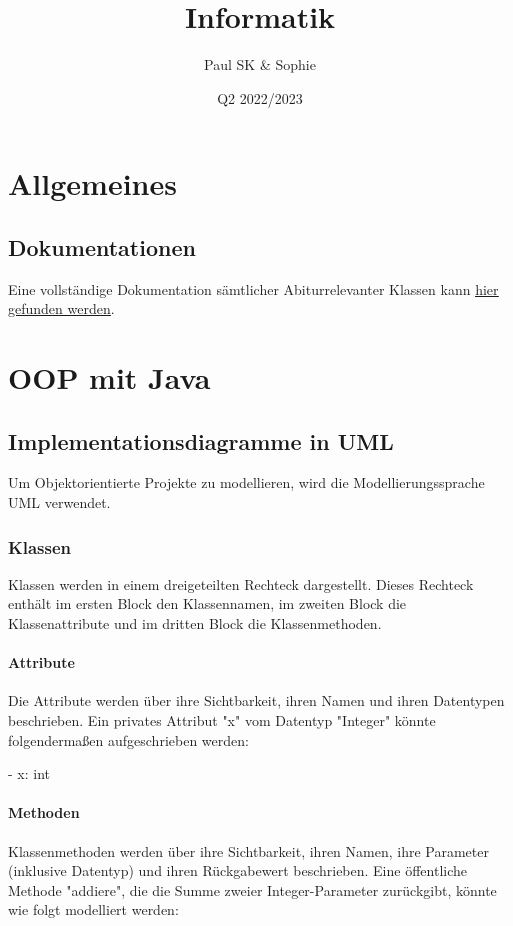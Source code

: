 \documentclass{article}
\title{Informatik}
\date{Q2 2022/2023}
\author{Paul SK \& Sophie}
\begin{document}
	\maketitle
	\newpage


	\section{Allgemeines}
	\subsection{Dokumentationen}
	Eine vollständige Dokumentation sämtlicher Abiturrelevanter Klassen kann \href{https://www.schulentwicklung.nrw.de/lehrplaene/upload/klp\_SII/if/Dokumentation\_ZA-IF\_GK-LK\_ab\_2018\_2021\_12\_22.pdf}{\underline{hier gefunden werden}}.

	\section{OOP mit Java}
	\subsection{Implementationsdiagramme in UML}
	Um Objektorientierte Projekte zu modellieren, wird die Modellierungssprache UML verwendet.

	\subsubsection{Klassen}
	Klassen werden in einem dreigeteilten Rechteck dargestellt. Dieses Rechteck enthält im ersten Block den Klassennamen, im zweiten Block die Klassenattribute und im dritten Block die Klassenmethoden.

	\paragraph{Attribute}
	Die Attribute werden über ihre Sichtbarkeit, ihren Namen und ihren Datentypen beschrieben. Ein privates Attribut "x" vom Datentyp "Integer" könnte folgendermaßen aufgeschrieben werden:

	\begin{center}
		- x: int
	\end{center}

	\paragraph{Methoden}
	Klassenmethoden werden über ihre Sichtbarkeit, ihren Namen, ihre Parameter (inklusive Datentyp) und ihren Rückgabewert beschrieben. Eine öffentliche Methode "addiere", die die Summe zweier Integer-Parameter zurückgibt, könnte wie folgt modelliert werden:
\end{document}
